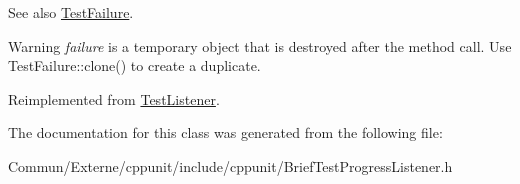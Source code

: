 \begin{DoxySeeAlso}{See also}
\hyperlink{class_test_failure}{Test\+Failure}. 
\end{DoxySeeAlso}
\begin{DoxyWarning}{Warning}
{\itshape failure} is a temporary object that is destroyed after the method call. Use Test\+Failure\+::clone() to create a duplicate. 
\end{DoxyWarning}


Reimplemented from \hyperlink{class_test_listener_a103216a5814c907f7b752b969477e765}{Test\+Listener}.



The documentation for this class was generated from the following file\+:\begin{DoxyCompactItemize}
\item 
Commun/\+Externe/cppunit/include/cppunit/Brief\+Test\+Progress\+Listener.\+h\end{DoxyCompactItemize}
